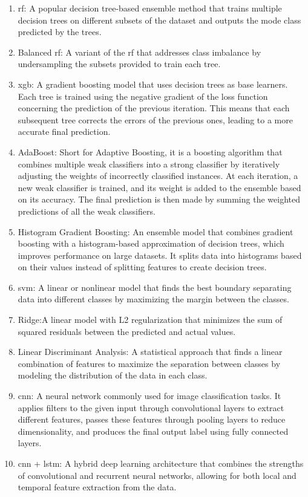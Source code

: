 \begin{enumerate}
	\item \ac{rf}: A popular decision tree-based ensemble method that trains multiple decision trees on different subsets of the dataset and outputs the mode class predicted by the trees.
	
	\item Balanced \ac{rf}: A variant of the \ac{rf} that addresses class imbalance by undersampling the subsets provided to train each tree.
	
	\item \ac{xgb}: A gradient boosting model that uses decision trees as base learners. Each tree is trained using the negative gradient of the loss function concerning the prediction of the previous iteration. This means that each subsequent tree corrects the errors of the previous ones, leading to a more accurate final prediction.
	
	\item AdaBoost: Short for Adaptive Boosting, it is a boosting algorithm that combines multiple weak classifiers into a strong classifier by iteratively adjusting the weights of incorrectly classified instances. At each iteration, a new weak classifier is trained, and its weight is added to the ensemble based on its accuracy. The final prediction is then made by summing the weighted predictions of all the weak classifiers.
	
	\item Histogram Gradient Boosting: An ensemble model that combines gradient boosting with a histogram-based approximation of decision trees, which improves performance on large datasets. It splits data into histograms based on their values instead of splitting features to create decision trees.
	
	\item \ac{svm}: A linear or nonlinear model that finds the best boundary separating data into different classes by maximizing the margin between the classes.
	
	\item Ridge:A linear model with L2 regularization that minimizes the sum of squared residuals between the predicted and actual values.
	
	\item Linear Discriminant Analysis: A statistical approach that finds a linear combination of features to maximize the separation between classes by modeling the distribution of the data in each class.
	
	\item \ac{cnn}: A neural network commonly used for image classification tasks. It applies filters to the given input through convolutional layers to extract different features, passes these features through pooling layers to reduce dimensionality, and produces the final output label using fully connected layers.
	
	\item \ac{cnn} + \ac{lstm}: A hybrid deep learning architecture that combines the strengths of convolutional and recurrent neural networks, allowing for both local and temporal feature extraction from the data.
\end{enumerate}



